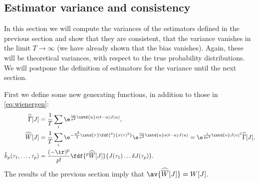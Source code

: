 \documentclass[12pt]{article}
\newcommand{\hhz}{\widehat{\overline{\Gamma}}}
\newcommand{\hhw}{\widehat{\overline{W}}}
\begin{document}

\subsection{Estimator variance and consistency}\label{sec:poissonvar}

In this section we will compute the variances of the estimators defined in the previous section and show that they are consistent, \ie that the variance vanishes in the limit $T\to\infty$ (we have already shown that the bias vanishes).
Again, these will be theoretical variances, with respect to the true probability distributions.
We will postpone the definition of estimators for the variance until the next section.

First we define some new generating functions, in addition to those in \eqref{eq:wienergen}:
%
\begin{equation}\label{eq:ratewienergen}
  \begin{aligned}
    \hhz[J] &= \frac{1}{T}\sum_i\e^{\frac{\ir}{\sigma^2}\intd{u}s(t-u)J(u)}, \\
    \hhw[J] &= \frac{1}{T}\sum_i\e^{-\frac{\sigma^2}{2}\intd{\tau}\fdf{^2}{x(\tau)^2}} \e^{\frac{\ir}{\sigma^2}\intd{u}s(t-u)J(u)}
    =  \e^{\frac{1}{2\sigma^2} \intd{v}J(v)^2} \hhz[J], \\
    \hat{k}_p(\tau_1,\ldots,\tau_p) &= \frac{(-\ir)^{p}}{p!} \fdf{^p \hhw[J]}{J(\tau_1)\ldots\delta J(\tau_p)}.
  \end{aligned}
\end{equation}
%
The results of the previous section imply that $\av{\hhw[J]}=W[J]$.
\end{document}
